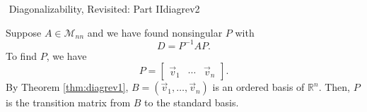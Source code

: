         \begin{theorem}{\Stop\,\,Diagonalizability, Revisited: Part II}{diagrev2}

            Suppose \(A\in\mathcal{M}_{nn}\) and we have found nonsingular \(P\) with
            \begin{equation*}
                D=P^{-1}AP.
            \end{equation*}
            To find \(P\), we have
            \begin{equation*}
                P=\begin{bmatrix}
                    \vec{v}_1 & \cdots & \vec{v}_n
                \end{bmatrix}.
            \end{equation*}
            By Theorem \ref{thm:diagrev1}, \(B=(\vec{v}_1,\ldots,\vec{v}_n)\) is an ordered basis of \(\mathbb{R}^n\). Then, \(P\) is the transition matrix from \(B\) to the standard basis.
            
        \end{theorem}